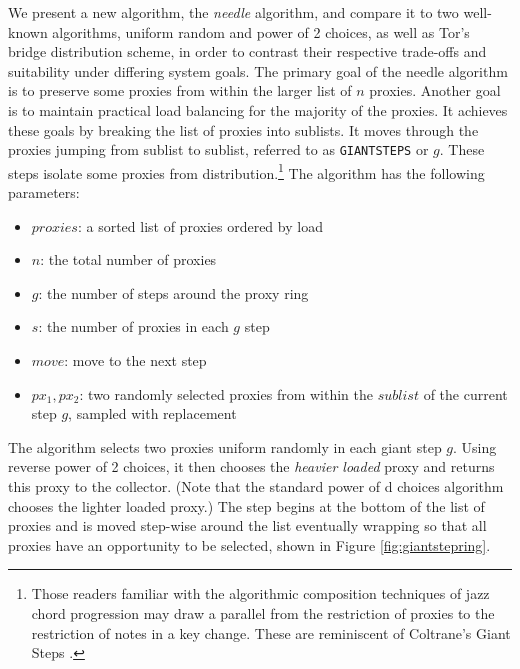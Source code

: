 We present a new algorithm, the \emph{needle} algorithm, and compare it to two well-known algorithms, uniform random and power of 2 choices, as well as Tor's bridge distribution scheme, in order to contrast their respective trade-offs and suitability under differing system goals. The primary goal of the needle algorithm is to preserve some proxies from within the larger list of $n$ proxies. Another goal is to maintain practical load balancing for the majority of the proxies. It achieves these goals by breaking the list of proxies into sublists. It moves through the proxies jumping from sublist to sublist, referred to as \texttt{GIANTSTEPS} or $g$. These steps isolate some proxies from distribution.\footnote{Those readers familiar with the algorithmic composition techniques of jazz chord progression may draw a parallel from the restriction of proxies to the restriction of notes in a key change. These are reminiscent of Coltrane's Giant Steps \cite{lateef1981repository}.} The algorithm has the following parameters:
    \begin{itemize}
        \item $proxies$: a sorted list of proxies ordered by load
        \item $n$: the total number of proxies
        \item $g$: the number of steps around the proxy ring
        \item $s$: the number of proxies in each $g$ step
        \item $move$: move to the next step 
        \item $px_1, px_2$: two randomly selected proxies from within the $sublist$ of the current step $g$, sampled with replacement
    \end{itemize}

The algorithm selects two proxies uniform randomly in each giant step $g$. Using reverse power of 2 choices, it then chooses the \textit{heavier loaded} proxy and returns this proxy to the collector. (Note that the standard power of d choices algorithm chooses the lighter loaded proxy.) The step begins at the bottom of the list of proxies and is moved step-wise around the list eventually wrapping so that all proxies have an opportunity to be selected, shown in Figure \ref{fig:giantstepring}.

